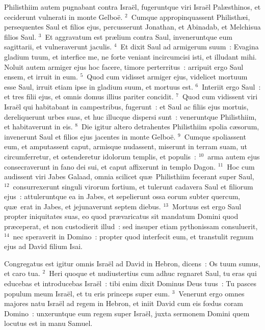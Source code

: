 \bchapter
\lettrine[lines=3,image=true,loversize=0.05,lraise=-0.03]{P}{}hilisthiim autem pugnabant contra Isra\"el, fugeruntque viri Isra\"el Pal\ae sthinos, et ceciderunt vulnerati in monte Gelbo\"e.
${}^{2}$~Cumque appropinquassent Philisth\ae i, persequentes Saul et filios ejus, percusserunt Jonathan, et Abinadab, et Melchisua filios Saul.
${}^{3}$~Et aggravatum est pr\ae lium contra Saul, inveneruntque eum sagittarii, et vulneraverunt jaculis.
${}^{4}$~Et dixit Saul ad armigerum suum~: Evagina gladium tuum, et interfice me, ne forte veniant incircumcisi isti, et illudant mihi. Noluit autem armiger ejus hoc facere, timore perterritus~: arripuit ergo Saul ensem, et irruit in eum.
${}^{5}$~Quod cum vidisset armiger ejus, videlicet mortuum esse Saul, irruit etiam ipse in gladium suum, et mortuus est.
${}^{6}$~Interiit ergo Saul~: et tres filii ejus, et omnis domus illius pariter concidit.
${}^{7}$~Quod cum vidissent viri Isra\"el qui habitabant in campestribus, fugerunt~: et Saul ac filiis ejus mortuis, dereliquerunt urbes suas, et huc illucque dispersi sunt~: veneruntque Philisthiim, et habitaverunt in eis.
${}^{8}$~Die igitur altero detrahentes Philisthiim spolia c\ae sorum, invenerunt Saul et filios ejus jacentes in monte Gelbo\"e.
${}^{9}$~Cumque spoliassent eum, et amputassent caput, armisque nudassent, miserunt in terram suam, ut circumferretur, et ostenderetur idolorum templis, et populis~:
${}^{10}$~arma autem ejus consecraverunt in fano dei sui, et caput affixerunt in templo Dagon.
${}^{11}$~Hoc cum audissent viri Jabes Galaad, omnia scilicet qu\ae\ Philisthiim fecerant super Saul,
${}^{12}$~consurrexerunt singuli virorum fortium, et tulerunt cadavera Saul et filiorum ejus~: attuleruntque ea in Jabes, et sepelierunt ossa eorum subter quercum, qu\ae\ erat in Jabes, et jejunaverunt septem diebus.
${}^{13}$~Mortuus est ergo Saul propter iniquitates suas, eo quod pr\ae varicatus sit mandatum Domini quod pr\ae ceperat, et non custodierit illud~: sed insuper etiam pythonissam consuluerit,
${}^{14}$~nec speraverit in Domino~: propter quod interfecit eum, et transtulit regnum ejus ad David filium Isai.

\bchapter
\lettrine[lines=3,image=true,loversize=0.05,lraise=-0.03]{C}{}ongregatus est igitur omnis Isra\"el ad David in Hebron, dicens~: Os tuum sumus, et caro tua.
${}^{2}$~Heri quoque et nudiustertius cum adhuc regnaret Saul, tu eras qui educebas et introducebas Isra\"el~: tibi enim dixit Dominus Deus tuus~: Tu pasces populum meum Isra\"el, et tu eris princeps super eum.
${}^{3}$~Venerunt ergo omnes majores natu Isra\"el ad regem in Hebron, et iniit David cum eis fœdus coram Domino~: unxeruntque eum regem super Isra\"el, juxta sermonem Domini quem locutus est in manu Samuel.


